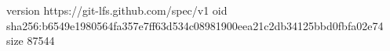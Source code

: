 version https://git-lfs.github.com/spec/v1
oid sha256:b6549e1980564fa357e7ff63d534c08981900eea21c2db34125bbd0fbfa02e74
size 87544
